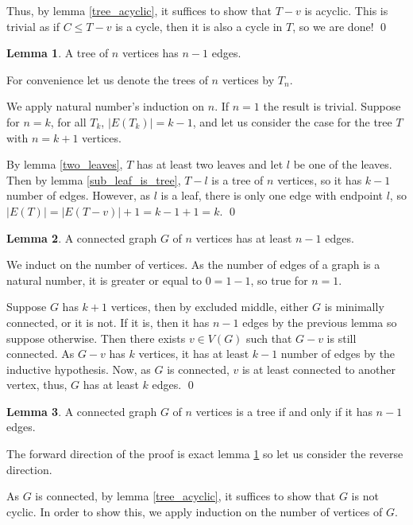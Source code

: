 \documentclass[
]{article}
\theoremstyle{definition}
\newtheorem{lemma}{Lemma}
\theoremstyle{definition}
\begin{document}
Thus, by lemma \ref{tree_acyclic}, it suffices to show that \(T - v\) is
acyclic. This is trivial as if \(C \le T - v\) is a cycle, then it is
also a cycle in \(T\), so we are done! \qed

\begin{lemma}\label{tree_edges}
  A tree of \(n\) vertices has \(n - 1\) edges.
\end{lemma}
\proof

For convenience let us denote the trees of \(n\) vertices by \(T_n\).

We apply natural number's induction on \(n\). If \(n = 1\) the result is
trivial. Suppose for \(n = k\), for all \(T_k\),
\(\left| E(T_k) \right| = k - 1\), and let us consider the case for the
tree \(T\) with \(n = k + 1\) vertices.

By lemma \ref{two_leaves}, \(T\) has at least two leaves and let \(l\)
be one of the leaves. Then by lemma \ref{sub_leaf_is_tree}, \(T - l\) is
a tree of \(n\) vertices, so it has \(k - 1\) number of edges. However,
as \(l\) is a leaf, there is only one edge with endpoint \(l\), so
\(\left| E(T) \right| = \left| E(T - v) \right| + 1 = k - 1 + 1 = k\).
\qed

\begin{lemma}
  A connected graph \(G\) of \(n\) vertices has at least \(n - 1\) edges.
\end{lemma}
\proof

We induct on the number of vertices. As the number of edges of a graph
is a natural number, it is greater or equal to \(0 = 1 - 1\), so true
for \(n = 1\).

Suppose \(G\) has \(k + 1\) vertices, then by excluded middle, either
\(G\) is minimally connected, or it is not. If it is, then it has
\(n - 1\) edges by the previous lemma so suppose otherwise. Then there
exists \(v \in V(G)\) such that \(G - v\) is still connected. As
\(G - v\) has \(k\) vertices, it has at least \(k - 1\) number of edges
by the inductive hypothesis. Now, as \(G\) is connected, \(v\) is at
least connected to another vertex, thus, \(G\) has at least \(k\) edges.
\qed

\begin{lemma}
  A connected graph \(G\) of \(n\) vertices is a tree if and only if it has 
  \(n - 1\) edges.
\end{lemma}
\proof

The forward direction of the proof is exact lemma \ref{tree_edges} so
let us consider the reverse direction.

As \(G\) is connected, by lemma \ref{tree_acyclic}, it suffices to show
that \(G\) is not cyclic. In order to show this, we apply induction on
the number of vertices of \(G\).
\end{document}
